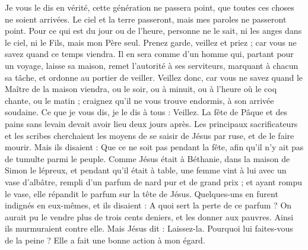 \begin{multicols}{2}
Je vous le dis en vérité, cette génération ne passera point, que toutes ces choses ne soient arrivées.
Le ciel et la terre passeront, mais mes paroles ne passeront point.
Pour ce qui est du jour ou de l’heure, personne ne le sait, ni les anges dans le ciel, ni le Fils{}, mais mon Père seul.
Prenez garde, veillez et priez ; car vous ne savez quand ce temps viendra.
Il en sera comme d’un homme qui, partant pour un voyage, laisse sa maison, remet l’autorité à ses serviteurs, marquant à chacun sa tâche, et ordonne au portier de veiller.
Veillez donc, car vous ne savez quand le Maître de la maison viendra, ou le soir, ou à minuit, ou à l'heure où le coq chante, ou le matin ;
craignez qu’il ne vous trouve endormis, à son arrivée soudaine.
Ce que je vous dis, je le dis à tous : Veillez.
\VerseOne{}La fête de Pâque et des pains sans levain devait avoir lieu deux jours après. Les principaux sacrificateurs et les scribes cherchaient les moyens de se saisir de Jésus par ruse, et de le faire mourir.
Mais ils disaient : Que ce ne soit pas pendant la fête, afin qu'il n’y ait pas de tumulte parmi le peuple.
Comme Jésus était à Béthanie, dans la maison de Simon le lépreux, et pendant qu’il était à table, une femme vint à lui avec un vase d'albâtre, rempli d'un parfum de nard pur et de grand prix ; et ayant rompu le vase, elle répandit le parfum sur la tête de Jésus.
Quelques-uns en furent indignés en eux-mêmes, et ils disaient : A quoi sert la perte de ce parfum ?
On aurait pu le vendre plus de trois cents deniers, et les donner aux pauvres. Ainsi ils murmuraient contre elle.
Mais Jésus dit : Laissez-la. Pourquoi lui faites-vous de la peine ? Elle a fait une bonne action à mon égard.

\end{multicols}
